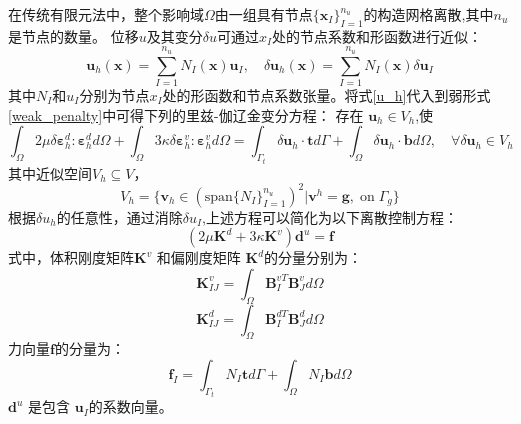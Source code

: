 在传统有限元法中，整个影响域$\Omega$由一组具有节点$\{\boldsymbol x_I\}_{I=1}^{n_u}$的构造网格离散\cite{hughes2000},其中$n_u$是节点的数量。
位移$u$及其变分$\delta u $可通过$x_I$处的节点系数和形函数进行近似：
\begin{equation}\label{u_h}
    \boldsymbol u_h(\boldsymbol x) = \sum_{I=1}^{n_u} N_I(\boldsymbol x) \boldsymbol u_I, \quad
    \delta \boldsymbol u_h(\boldsymbol x) = \sum_{I=1}^{n_u} N_I(\boldsymbol x) \delta \boldsymbol u_I
\end{equation}
其中$N_I$和$u_I$分别为节点$x_I$处的形函数和节点系数张量。将式\eqref{u_h}代入到弱形式\eqref{weak_penalty}中可得下列的里兹-伽辽金变分方程：
存在 $\boldsymbol u_h \in V_h$,使
\begin{equation}\label{ritz_penalty}
\int_\Omega 2\mu \delta \boldsymbol \varepsilon^d_h : \boldsymbol \varepsilon^d_h d\Omega +
\int_\Omega 3\kappa \delta \boldsymbol \varepsilon^v_h : \boldsymbol \varepsilon^v_h d\Omega =
\int_{\Gamma_t} \delta \boldsymbol u_h \cdot \boldsymbol t d\Gamma + \int_\Omega \delta \boldsymbol u_h \cdot \boldsymbol b d\Omega, \quad
\forall \delta \boldsymbol u_h \in V_h
\end{equation}
其中近似空间$V_h \subseteq V$，
\begin{equation}
    V_h = \{\boldsymbol v_h \in (\mathrm{span}\{N_I\}_{I=1}^{n_u})^2 \vert \boldsymbol v^h = \boldsymbol g,\; \mathrm{on} \; \Gamma_g\}
\end{equation}
根据$\delta u_h$的任意性，通过消除$\delta u_I$,上述方程可以简化为以下离散控制方程：
\begin{equation}\label{equilibrium_penalty}
    (2\mu\boldsymbol K^d + 3\kappa\boldsymbol K^v) \boldsymbol d^u = \boldsymbol f
\end{equation}
式中，体积刚度矩阵$\boldsymbol K^v$ 和偏刚度矩阵 $\boldsymbol K^d$的分量分别为：
\begin{equation}\label{stiffness_vol}
    \boldsymbol K^v_{IJ}= \int_{\Omega} \boldsymbol B^{vT}_I \boldsymbol B^v_J d\Omega
\end{equation}
\begin{equation}
    \boldsymbol K^d_{IJ}= \int_{\Omega} \boldsymbol B^{dT}_I \boldsymbol B^d_J d\Omega
\end{equation}
力向量$\boldsymbol f$的分量为：
\begin{equation}
    \boldsymbol f_I = \int_{\Gamma_t} N_I \boldsymbol t d\Gamma + \int_{\Omega} N_I \boldsymbol b d\Omega
\end{equation}
$\boldsymbol d^u$ 是包含 $\boldsymbol u_I$的系数向量。

